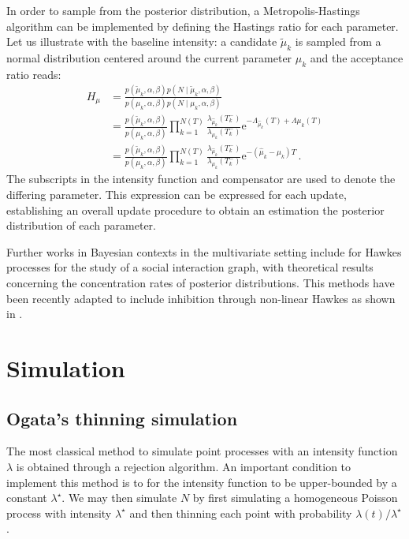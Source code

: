In order to sample from the posterior distribution, a Metropolis-Hastings algorithm can be implemented by defining the Hastings ratio for each parameter.
Let us illustrate with the baseline intensity: a candidate $\tilde \mu_k$ is sampled from a normal distribution centered around the current parameter $\mu_k$ and the acceptance ratio reads:
\begin{align*}
    H_\mu &=\frac{p(\tilde \mu_k, \alpha, \beta) p(N\mid \tilde \mu_k, \alpha, \beta)}{p(\mu_k, \alpha, \beta) p(N\mid \mu_k, \alpha, \beta)}\\
    &= \frac{p(\tilde \mu_k, \alpha, \beta)}{p(\mu_k, \alpha, \beta)}\prod_{k=1}^{N(T)}\frac{\lambda_{\hat \mu_k}(T_k^-)}{\lambda_{\mu_k}(T_k^-)}\mathrm{e}^{-\Lambda_{\hat \mu_k}(T) + \Lambda{\mu_k}(T)}\\
    &=\frac{p(\tilde \mu_k, \alpha, \beta)}{p(\mu_k, \alpha, \beta)}\prod_{k=1}^{N(T)}\frac{\lambda_{\hat \mu_k}(T_k^-)}{\lambda_{\mu_k}(T_k^-)}\mathrm{e}^{-(\hat\mu_k - \mu_k) T}\,.
\end{align*}
The subscripts in the intensity function and compensator are used to denote the differing parameter.
This expression can be expressed for each update, establishing an overall update procedure to obtain an estimation the posterior distribution of each parameter.

Further works in Bayesian contexts in the multivariate setting include \textcite{Blundell2012} for Hawkes processes for the study of a social interaction graph, \textcite{Donnet2020} with theoretical results concerning the concentration rates of posterior distributions. This methods have been recently adapted to include inhibition through non-linear Hawkes as shown in \textcite{Deutsch2022, Sulem2024}. 

\section{Simulation}\label{sec:chap1_simulation}

\subsection{Ogata's thinning simulation}

The most classical method to simulate point processes with an intensity function $\lambda$ is obtained through a rejection algorithm. An important condition to implement this method is to for the intensity function to be upper-bounded by a constant $\lambda^\star$.
We may then simulate $N$ by first simulating a homogeneous Poisson process with intensity $\lambda^\star$ and then thinning each point with probability $\lambda(t) / \lambda^\star$.

